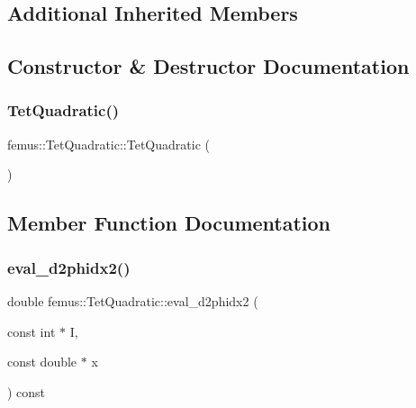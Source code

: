 \subsection*{Additional Inherited Members}


\subsection{Constructor \& Destructor Documentation}
\mbox{\label{classfemus_1_1_tet_quadratic_abe5d9b7fa35ec126228aac3d6d938cc8}} 
\subsubsection{\texorpdfstring{Tet\+Quadratic()}{TetQuadratic()}}
{\footnotesize\ttfamily femus\+::\+Tet\+Quadratic\+::\+Tet\+Quadratic (\begin{DoxyParamCaption}{ }\end{DoxyParamCaption})\hspace{0.3cm}{\ttfamily [inline]}}



\subsection{Member Function Documentation}
\mbox{\label{classfemus_1_1_tet_quadratic_a41a83721de075980d8138bb457ddc937}} 
\subsubsection{\texorpdfstring{eval\+\_\+d2phidx2()}{eval\_d2phidx2()}}
{\footnotesize\ttfamily double femus\+::\+Tet\+Quadratic\+::eval\+\_\+d2phidx2 (\begin{DoxyParamCaption}\item[{const int $\ast$}]{I,  }\item[{const double $\ast$}]{x }\end{DoxyParamCaption}) const\hspace{0.3cm}{\ttfamily [virtual]}}



